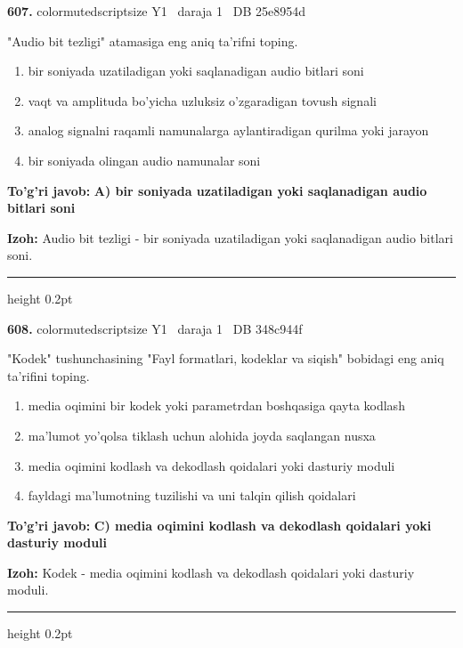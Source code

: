 \documentclass[10pt,a4paper,oneside]{article}
\begin{document}
\noindent\textbf{\color{ink}607.}  {color{muted}scriptsize Y1 \textbullet\ daraja 1 \textbullet\ DB 25e8954d}
\par
"Audio bit tezligi" atamasiga eng aniq ta'rifni toping.
\begin{enumerate}[label=\Alph*),leftmargin=9mm]
\item bir soniyada uzatiladigan yoki saqlanadigan audio bitlari soni
\item vaqt va amplituda bo'yicha uzluksiz o'zgaradigan tovush signali
\item analog signalni raqamli namunalarga aylantiradigan qurilma yoki jarayon
\item bir soniyada olingan audio namunalar soni
\end{enumerate}
\begin{tcolorbox}[enhanced,breakable,colback=teal!4,colframe=teal!50!black,boxrule=0.5pt,arc=1.1mm,left=3mm,right=3mm,top=1.7mm,bottom=1.7mm,before skip=2mm,after skip=2mm]
\textbf{\color{teal}To'g'ri javob:} \textbf{A) bir soniyada uzatiladigan yoki saqlanadigan audio bitlari soni}
\par\smallskip
\textbf{Izoh:} Audio bit tezligi - bir soniyada uzatiladigan yoki saqlanadigan audio bitlari soni.
\end{tcolorbox}
\vspace{2mm}\hrule height 0.2pt \vspace{3mm}

\noindent\textbf{\color{ink}608.}  {color{muted}scriptsize Y1 \textbullet\ daraja 1 \textbullet\ DB 348c944f}
\par
"Kodek" tushunchasining "Fayl formatlari, kodeklar va siqish" bobidagi eng aniq ta'rifini toping.
\begin{enumerate}[label=\Alph*),leftmargin=9mm]
\item media oqimini bir kodek yoki parametrdan boshqasiga qayta kodlash
\item ma'lumot yo'qolsa tiklash uchun alohida joyda saqlangan nusxa
\item media oqimini kodlash va dekodlash qoidalari yoki dasturiy moduli
\item fayldagi ma'lumotning tuzilishi va uni talqin qilish qoidalari
\end{enumerate}
\begin{tcolorbox}[enhanced,breakable,colback=teal!4,colframe=teal!50!black,boxrule=0.5pt,arc=1.1mm,left=3mm,right=3mm,top=1.7mm,bottom=1.7mm,before skip=2mm,after skip=2mm]
\textbf{\color{teal}To'g'ri javob:} \textbf{C) media oqimini kodlash va dekodlash qoidalari yoki dasturiy moduli}
\par\smallskip
\textbf{Izoh:} Kodek - media oqimini kodlash va dekodlash qoidalari yoki dasturiy moduli.
\end{tcolorbox}
\vspace{2mm}\hrule height 0.2pt \vspace{3mm}
\end{document}
